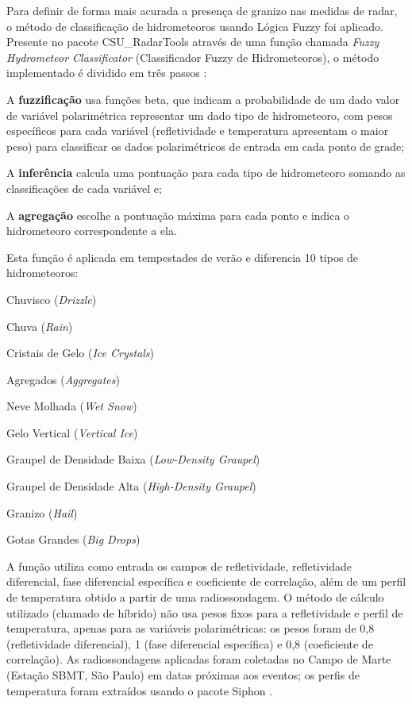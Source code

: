 Para definir de forma mais acurada a presença de granizo nas medidas de radar, o método de classificação de hidrometeoros usando Lógica Fuzzy foi aplicado. Presente no pacote CSU\_RadarTools \cite{Lang2017a} através de uma função chamada \textit{Fuzzy Hydrometeor Classificator} (Classificador Fuzzy de Hidrometeoros), o método implementado é dividido em três passos \cite{Liu2000a}:

\begin{alineas}
	\item A \textbf{fuzzificação} usa funções beta, que indicam a probabilidade de um dado valor de variável polarimétrica representar um dado tipo de hidrometeoro, com pesos específicos para cada variável (refletividade e temperatura apresentam o maior peso) para classificar os dados polarimétricos de entrada em cada ponto de grade;
	\item A \textbf{inferência} calcula uma pontuação para cada tipo de hidrometeoro somando as classificações de cada variável e;
	\item A \textbf{agregação} escolhe a pontuação máxima para cada ponto e indica o hidrometeoro correspondente a ela.
\end{alineas}

Esta função é aplicada em tempestades de verão e diferencia 10 tipos de hidrometeoros:

\begin{alineas}
	\item Chuvisco (\textit{Drizzle})
	\item Chuva (\textit{Rain})
	\item Cristais de Gelo (\textit{Ice Crystals})
	\item Agregados (\textit{Aggregates})
	\item Neve Molhada (\textit{Wet Snow})
	\item Gelo Vertical (\textit{Vertical Ice})
	\item Graupel de Densidade Baixa (\textit{Low-Density Graupel})
	\item Graupel de Densidade Alta (\textit{High-Density Graupel})
	\item Granizo (\textit{Hail})
	\item Gotas Grandes (\textit{Big Drops})
\end{alineas}

A função utiliza como entrada os campos de refletividade, refletividade diferencial, fase diferencial específica e coeficiente de correlação, além de um perfil de temperatura obtido a partir de uma radiossondagem. O método de cálculo utilizado (chamado de híbrido) não usa pesos fixos para a refletividade e perfil de temperatura, apenas para as variáveis polarimétricas: os pesos foram de 0,8 (refletividade diferencial), 1 (fase diferencial específica) e 0,8 (coeficiente de correlação). As radiossondagens aplicadas foram coletadas no Campo de Marte (Estação SBMT, São Paulo) em datas próximas aos eventos; os perfis de temperatura foram extraídos usando o pacote Siphon \cite{siphon}.

